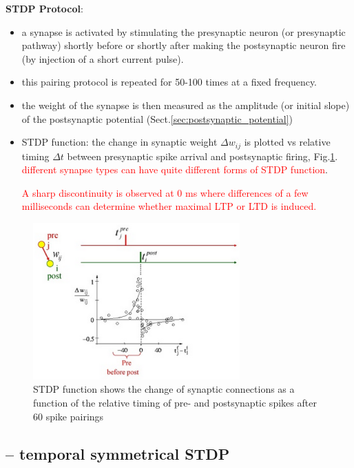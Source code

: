 {\bf STDP Protocol}:
\begin{itemize}
  \item a synapse is activated by stimulating the presynaptic neuron (or
  presynaptic pathway) shortly before or shortly after making the postsynaptic
  neuron fire (by injection of a short current pulse).
  
  \item this pairing protocol is repeated for 50-100 times at a fixed frequency.
  
  \item the weight of the synapse is then measured as the amplitude (or initial
  slope) of the postsynaptic potential (Sect.\ref{sec:postsynaptic_potential})
  
  \item STDP function: the change in synaptic weight $\Delta w_{ij}$ is plotted
  vs relative timing $\Delta t$ between presynaptic spike arrival and postsynaptic firing,
  Fig.\ref{fig:STDP_plot}. \textcolor{red}{different synapse types can have
  quite different forms of STDP function}.

\textcolor{red}{A sharp discontinuity is observed at 0 ms where differences of a
few milliseconds can determine whether maximal LTP or LTD is induced.}
\end{itemize}

\begin{figure}[htbp]
\centerline{\includegraphics[height=6cm]{./images/STDP_plot.eps}}
\caption{STDP function shows the change of synaptic connections as a function of
the relative timing of pre- and postsynaptic spikes after 60 spike pairings}\label{fig:STDP_plot}
\end{figure} 


\subsection{-- temporal symmetrical STDP}

